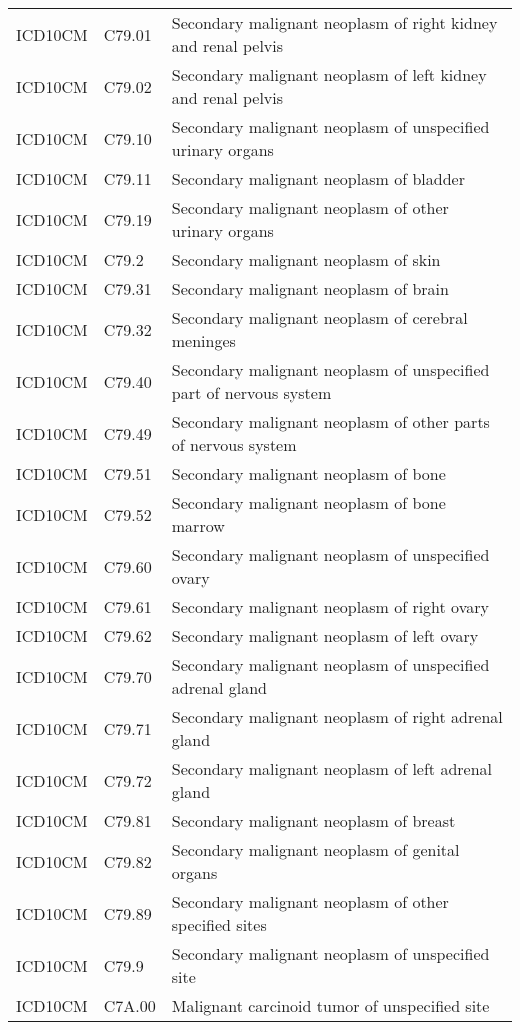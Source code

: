 \begin{longtable}{p{}p{}p{}}
  ICD10CM & C79.01 & Secondary malignant neoplasm of right kidney and renal pelvis \\ 
  ICD10CM & C79.02 & Secondary malignant neoplasm of left kidney and renal pelvis \\ 
  ICD10CM & C79.10 & Secondary malignant neoplasm of unspecified urinary organs \\ 
  ICD10CM & C79.11 & Secondary malignant neoplasm of bladder \\ 
  ICD10CM & C79.19 & Secondary malignant neoplasm of other urinary organs \\ 
  ICD10CM & C79.2 & Secondary malignant neoplasm of skin \\ 
  ICD10CM & C79.31 & Secondary malignant neoplasm of brain \\ 
  ICD10CM & C79.32 & Secondary malignant neoplasm of cerebral meninges \\ 
  ICD10CM & C79.40 & Secondary malignant neoplasm of unspecified part of nervous system \\ 
  ICD10CM & C79.49 & Secondary malignant neoplasm of other parts of nervous system \\ 
  ICD10CM & C79.51 & Secondary malignant neoplasm of bone \\ 
  ICD10CM & C79.52 & Secondary malignant neoplasm of bone marrow \\ 
  ICD10CM & C79.60 & Secondary malignant neoplasm of unspecified ovary \\ 
  ICD10CM & C79.61 & Secondary malignant neoplasm of right ovary \\ 
  ICD10CM & C79.62 & Secondary malignant neoplasm of left ovary \\ 
  ICD10CM & C79.70 & Secondary malignant neoplasm of unspecified adrenal gland \\ 
  ICD10CM & C79.71 & Secondary malignant neoplasm of right adrenal gland \\ 
  ICD10CM & C79.72 & Secondary malignant neoplasm of left adrenal gland \\ 
  ICD10CM & C79.81 & Secondary malignant neoplasm of breast \\ 
  ICD10CM & C79.82 & Secondary malignant neoplasm of genital organs \\ 
  ICD10CM & C79.89 & Secondary malignant neoplasm of other specified sites \\ 
  ICD10CM & C79.9 & Secondary malignant neoplasm of unspecified site \\ 
  ICD10CM & C7A.00 & Malignant carcinoid tumor of unspecified site \\ 

\end{longtable}
